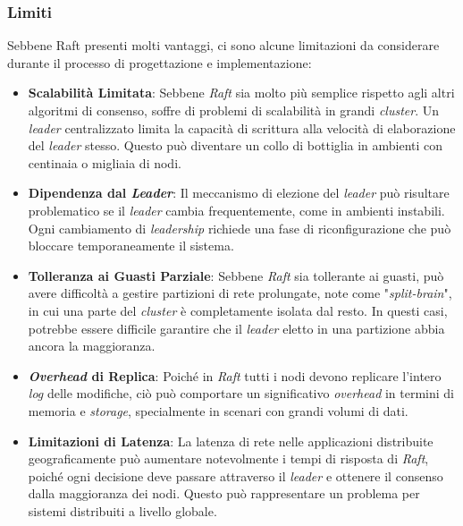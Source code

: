 \subsubsection{Limiti}
Sebbene Raft presenti molti vantaggi, ci sono alcune limitazioni da considerare durante il processo di progettazione e implementazione:
\begin{itemize}
  \item \textbf{Scalabilità Limitata}: Sebbene \textit{Raft} sia molto più semplice rispetto agli altri algoritmi di consenso, soffre di problemi di scalabilità in grandi \textit{cluster}. Un \textit{leader} centralizzato limita 
  la capacità di scrittura alla velocità di elaborazione del \textit{leader} stesso. Questo può diventare un collo di bottiglia in ambienti con centinaia o migliaia di nodi.

  \item \textbf{Dipendenza dal \textit{Leader}}: Il meccanismo di elezione del \textit{leader} può risultare problematico se il \textit{leader} cambia frequentemente, come in ambienti instabili. Ogni cambiamento di 
  \textit{leadership} richiede una fase di riconfigurazione che può bloccare temporaneamente il sistema.

  \item \textbf{Tolleranza ai Guasti Parziale}: Sebbene \textit{Raft} sia tollerante ai guasti, può avere difficoltà a gestire partizioni di rete prolungate, note come "\textit{split-brain}", in cui una parte del \textit{cluster}
  è completamente isolata dal resto. In questi casi, potrebbe essere difficile garantire che il \textit{leader} eletto in una partizione abbia ancora la maggioranza.

  \item \textbf{\textit{Overhead} di Replica}: Poiché in \textit{Raft} tutti i nodi devono replicare l'intero \textit{log} delle modifiche, ciò può comportare un significativo \textit{overhead} in termini di memoria e 
  \textit{storage}, specialmente in scenari con grandi volumi di dati.

  \item \textbf{Limitazioni di Latenza}: La latenza di rete nelle applicazioni distribuite geograficamente può aumentare notevolmente i tempi di risposta di \textit{Raft}, poiché ogni decisione deve passare attraverso il 
  \textit{leader} e ottenere il consenso dalla maggioranza dei nodi. Questo può rappresentare un problema per sistemi distribuiti a livello globale.
\end{itemize}





